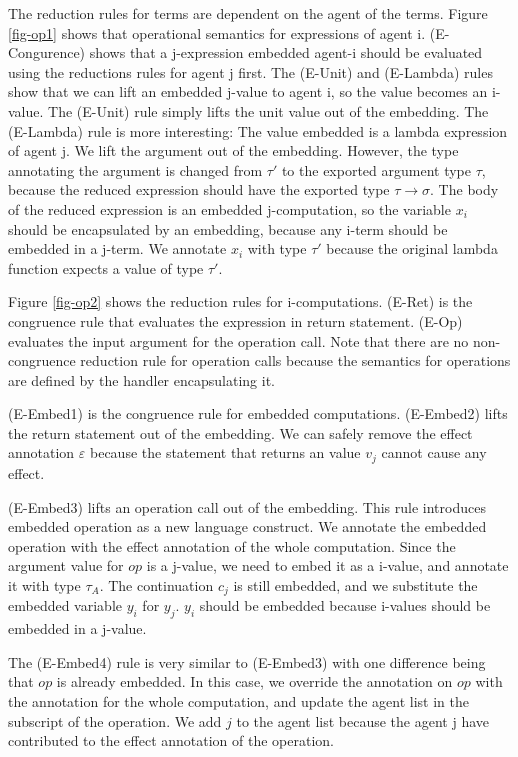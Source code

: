 The reduction rules for terms are dependent on the agent of the terms. Figure \ref{fig-op1} shows that operational semantics for expressions of agent i. (E-Congurence) shows that a j-expression embedded agent-i should be evaluated using the reductions rules for agent j first. The (E-Unit) and (E-Lambda) rules show that we can lift an embedded j-value to agent i, so the value becomes an i-value. The (E-Unit) rule simply lifts the unit value out of the embedding. The (E-Lambda) rule is more interesting: The value embedded is a lambda expression of agent j. We lift the argument out of the embedding. However, the type annotating the argument is changed from $\tau'$ to the exported argument type $\tau$, because the reduced expression should have the exported type $\tau \rightarrow \sigma$. The body of the reduced expression is an embedded j-computation, so the variable $x_i$ should be encapsulated by an embedding, because any i-term should be embedded in a j-term. We annotate $x_i$ with type $\tau'$ because the original lambda function expects a value of type $\tau'$. 

Figure \ref{fig-op2} shows the reduction rules for i-computations. (E-Ret) is the congruence rule that evaluates the expression in return statement. (E-Op) evaluates the input argument for the operation call. Note that there are no non-congruence reduction rule for operation calls because the semantics for operations are defined by the handler encapsulating it. 

(E-Embed1) is the congruence rule for embedded computations. (E-Embed2) lifts the return statement out of the embedding. We can safely remove the effect annotation $\varepsilon$ because the statement that returns an value $v_j$ cannot cause any effect. 

(E-Embed3) lifts an operation call out of the embedding. This rule introduces embedded operation as a new language construct. We annotate the embedded operation with the effect annotation of the whole computation. Since the argument value for $op$ is a j-value, we need to embed it as a i-value, and annotate it with type $\tau_A$. The continuation $c_j$ is still embedded, and we substitute the embedded variable $y_i$ for $y_j$. $y_i$ should be embedded because  i-values should be embedded in a j-value.

The (E-Embed4) rule is very similar to (E-Embed3) with one difference being that $op$ is already embedded. In this case, we override the annotation on $op$ with the annotation for the whole computation, and update the agent list in the subscript of the operation. We add $j$ to the agent list because the agent j have contributed to the effect annotation of the operation.


